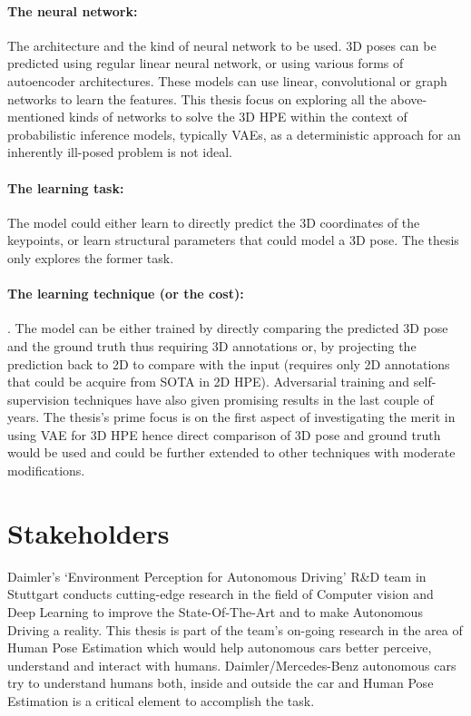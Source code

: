 \paragraph{The neural network:} The architecture and the kind of neural network to be used. 3D poses can be predicted using regular linear neural network, or using various forms of autoencoder architectures. These models can use linear, convolutional or graph networks to learn the features. This thesis focus on exploring all the above-mentioned kinds of networks to solve the 3D \ac{HPE} within the context of probabilistic inference models, typically \ac{VAE}s, as a deterministic approach for an inherently ill-posed problem is not ideal. 

\paragraph{The learning task:} The model could either learn to directly predict the 3D coordinates of the keypoints, or learn structural parameters that could model a 3D pose. The thesis only explores the former task.

\paragraph{The learning technique (or the cost):}. The model can be either trained by directly comparing the predicted 3D pose and the ground truth thus requiring 3D annotations or, by projecting the prediction back to 2D to compare with the input (requires only 2D annotations that could be acquire from \ac{SOTA} in 2D \ac{HPE}). Adversarial training and self-supervision techniques have also given promising results in the last couple of years. The thesis's prime focus is on the first aspect of investigating the merit in using \ac{VAE} for 3D \ac{HPE} hence direct comparison of 3D pose and ground truth would be used and could be further extended to other techniques with moderate modifications.


\section{Stakeholders}
Daimler’s ‘Environment Perception for Autonomous Driving’ R\&D team in Stuttgart conducts cutting-edge research in the field of Computer vision and Deep Learning to improve the State-Of-The-Art and to make Autonomous Driving a reality. This thesis is part of the team’s on-going research in the area of Human Pose Estimation which would help autonomous cars better perceive, understand and interact with humans. Daimler/Mercedes-Benz autonomous cars try to understand humans both, inside and outside the car and Human Pose Estimation is a critical element to accomplish the task.

